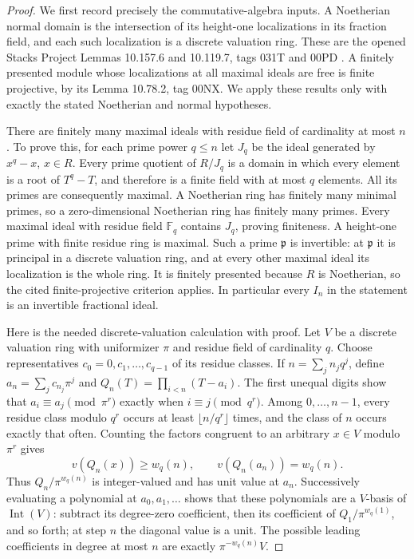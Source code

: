 \begin{proof}
We first record precisely the commutative-algebra inputs. A
Noetherian normal domain is the intersection of its height-one
localizations in its fraction field, and each such localization
is a discrete valuation ring. These are the opened Stacks Project
Lemmas 10.157.6 and 10.119.7, tags 031T and 00PD
\cite{StacksNormalDomains}. A finitely presented module whose
localizations at all maximal ideals are free is finite projective,
by its Lemma 10.78.2, tag 00NX. We apply these results only with
exactly the stated Noetherian and normal hypotheses.

There are finitely many maximal ideals with residue field of
cardinality at most $n$. To prove this, for each prime power $q\le n$
let $J_q$ be the ideal generated by $x^q-x$, $x\in R$.
Every prime quotient of $R/J_q$ is a domain in which every element
is a root of $T^q-T$, and therefore is a finite field with at most
$q$ elements. All its primes are consequently maximal. A
Noetherian ring has finitely many minimal primes, so a
zero-dimensional Noetherian ring has finitely many primes.
Every maximal ideal with residue field $\mathbb F_q$ contains
$J_q$, proving finiteness. A height-one prime with finite residue
ring is maximal. Such a prime $\mathfrak p$ is invertible: at
$\mathfrak p$ it is principal in a discrete valuation ring, and at
every other maximal ideal its localization is the whole ring.
It is finitely presented because $R$ is Noetherian, so the cited
finite-projective criterion applies. In particular every $I_n$
in the statement is an invertible fractional ideal.

Here is the needed discrete-valuation calculation with proof.
Let $V$ be a discrete valuation ring with uniformizer $\pi$ and
residue field of cardinality $q$. Choose representatives
$c_0=0,c_1,\ldots,c_{q-1}$ of its residue classes. If
$n=\sum_j n_jq^j$, define $a_n=\sum_jc_{n_j}\pi^j$ and
$Q_n(T)=\prod_{i<n}(T-a_i)$. The first unequal digits show that
$a_i\equiv a_j\pmod{\pi^r}$ exactly when
$i\equiv j\pmod{q^r}$. Among $0,\ldots,n-1$, every residue class
modulo $q^r$ occurs at least $\lfloor n/q^r\rfloor$ times, and the
class of $n$ occurs exactly that often. Counting the factors
congruent to an arbitrary $x\in V$ modulo $\pi^r$ gives
\[
 v(Q_n(x))\ge w_q(n),\qquad v(Q_n(a_n))=w_q(n).
\]
Thus $Q_n/\pi^{w_q(n)}$ is integer-valued and has unit value at
$a_n$. Successively evaluating a polynomial at $a_0,a_1,\ldots$
shows that these polynomials are a $V$-basis of
$\operatorname{Int}(V)$: subtract its degree-zero coefficient,
then its coefficient of $Q_1/\pi^{w_q(1)}$, and so forth; at step
$n$ the diagonal value is a unit. The possible leading coefficients
in degree at most $n$ are exactly $\pi^{-w_q(n)}V$.


\end{proof}
